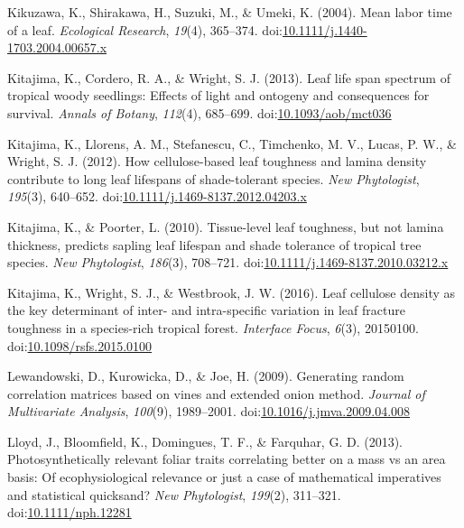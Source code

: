 \documentclass[12pt,]{article}
\theoremstyle{definition}
\theoremstyle{definition}
\theoremstyle{definition}
\theoremstyle{remark}
\begin{document}
\leavevmode\hypertarget{ref-Kikuzawa2004}{}%
Kikuzawa, K., Shirakawa, H., Suzuki, M., \& Umeki, K. (2004). Mean labor
time of a leaf. \emph{Ecological Research}, \emph{19}(4), 365--374.
doi:\href{https://doi.org/10.1111/j.1440-1703.2004.00657.x}{10.1111/j.1440-1703.2004.00657.x}

\leavevmode\hypertarget{ref-Kitajima2013}{}%
Kitajima, K., Cordero, R. A., \& Wright, S. J. (2013). Leaf life span
spectrum of tropical woody seedlings: Effects of light and ontogeny and
consequences for survival. \emph{Annals of Botany}, \emph{112}(4),
685--699.
doi:\href{https://doi.org/10.1093/aob/mct036}{10.1093/aob/mct036}

\leavevmode\hypertarget{ref-Kitajima2012}{}%
Kitajima, K., Llorens, A. M., Stefanescu, C., Timchenko, M. V., Lucas,
P. W., \& Wright, S. J. (2012). How cellulose-based leaf toughness and
lamina density contribute to long leaf lifespans of shade-tolerant
species. \emph{New Phytologist}, \emph{195}(3), 640--652.
doi:\href{https://doi.org/10.1111/j.1469-8137.2012.04203.x}{10.1111/j.1469-8137.2012.04203.x}

\leavevmode\hypertarget{ref-Kitajima2010}{}%
Kitajima, K., \& Poorter, L. (2010). Tissue-level leaf toughness, but
not lamina thickness, predicts sapling leaf lifespan and shade tolerance
of tropical tree species. \emph{New Phytologist}, \emph{186}(3),
708--721.
doi:\href{https://doi.org/10.1111/j.1469-8137.2010.03212.x}{10.1111/j.1469-8137.2010.03212.x}

\leavevmode\hypertarget{ref-Kitajima2016}{}%
Kitajima, K., Wright, S. J., \& Westbrook, J. W. (2016). Leaf cellulose
density as the key determinant of inter- and intra-specific variation in
leaf fracture toughness in a species-rich tropical forest.
\emph{Interface Focus}, \emph{6}(3), 20150100.
doi:\href{https://doi.org/10.1098/rsfs.2015.0100}{10.1098/rsfs.2015.0100}

\leavevmode\hypertarget{ref-Lewandowski2009}{}%
Lewandowski, D., Kurowicka, D., \& Joe, H. (2009). Generating random
correlation matrices based on vines and extended onion method.
\emph{Journal of Multivariate Analysis}, \emph{100}(9), 1989--2001.
doi:\href{https://doi.org/10.1016/j.jmva.2009.04.008}{10.1016/j.jmva.2009.04.008}

\leavevmode\hypertarget{ref-Lloyd2013}{}%
Lloyd, J., Bloomfield, K., Domingues, T. F., \& Farquhar, G. D. (2013).
Photosynthetically relevant foliar traits correlating better on a mass
vs an area basis: Of ecophysiological relevance or just a case of
mathematical imperatives and statistical quicksand? \emph{New
Phytologist}, \emph{199}(2), 311--321.
doi:\href{https://doi.org/10.1111/nph.12281}{10.1111/nph.12281}
\end{document}
